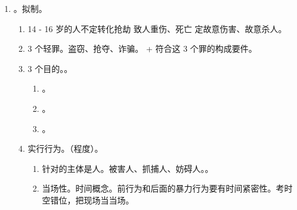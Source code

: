 \begin{enumerate}
\begin{enumerate}
\begin{enumerate}
\begin{enumerate}
\begin{itemize}
                                \end{itemize}
                        \end{enumerate}
                  \item 暴力行为、取财行为要有时空紧密性。当场性。\yi\si 步。
                        \begin{enumerate}
                          \item {}。
                          \item {}。
                        \end{enumerate}
                \end{enumerate}
          \item 既遂。因无法反抗被迫放弃财物 \yjt 取得财物（第二档，数额不大）。\san\si 步要有因果关系。
                。
          \item 另一个既遂标准。造成轻伤以上（司法解释）。
        \end{enumerate}
  \item {}。拟制。
        \begin{enumerate}
          \item 14 - 16 岁的人不定转化抢劫 \yjt 致人重伤、死亡 \yjt 定故意伤害、故意杀人。
          \item 3 个轻罪。\yi 盗窃、抢夺、诈骗。\er {} + 符合这 3 个罪的构成要件。
          \item 3 个目的。。
                \begin{enumerate}
                  \item {}。
                  \item {}。
                  \item {}。
                \end{enumerate}
          \item 实行行为。（程度）。
                \begin{enumerate}
                  \item 针对的主体是人。被害人、抓捕人、妨碍人。。
                  \item 当场性。时间概念。前行为和后面的暴力行为要有时间紧密性。考时空错位，把现场当当场。

\end{enumerate}
\end{enumerate}
\end{enumerate}
